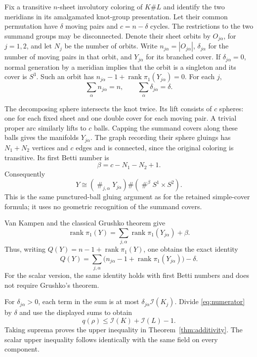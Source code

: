 \documentclass[11pt]{article}
\newcommand{\rank}{\operatorname{rank}}
\newcommand{\I}{\mathcal I}
\begin{document}
Fix a transitive $n$-sheet involutory coloring of $K\#L$ and identify
the two meridians in its amalgamated knot-group presentation.
Let their common permutation have $\delta$ moving pairs and
$c=n-\delta$ cycles. The restrictions to the two summand groups may
be disconnected. Denote their sheet orbits by $O_{j\alpha}$, for
$j=1,2$, and let $N_j$ be the number of orbits. Write
$n_{j\alpha}=|O_{j\alpha}|$, $\delta_{j\alpha}$ for the number of
moving pairs in that orbit, and $Y_{j\alpha}$ for its branched cover.
If $\delta_{j\alpha}=0$, normal generation by a meridian implies
that the orbit is a singleton and its cover is $S^3$. Such an orbit
has $n_{j\alpha}-1+\rank\pi_1(Y_{j\alpha})=0$.
For each $j$,
\[
        \sum_\alpha n_{j\alpha}=n,\qquad
        \sum_\alpha\delta_{j\alpha}=\delta.
\]

The decomposing sphere intersects the knot twice. Its lift consists
of $c$ spheres: one for each fixed sheet and one double cover for each
moving pair. A trivial proper arc similarly lifts to $c$ balls.
Capping the summand covers along these balls gives the manifolds
$Y_{j\alpha}$. The graph recording their sphere gluings has
$N_1+N_2$ vertices and $c$ edges and is connected, since the original
coloring is transitive. Its first Betti number is
\[
                         \beta=c-N_1-N_2+1.
\]
Consequently
\[
 Y\cong\left(\mathop{\#}_{j,\alpha}Y_{j\alpha}\right)
          \#\left(\mathop{\#}^{\beta}S^1\times S^2\right).
\]
This is the same punctured-ball gluing argument as for the retained
simple-cover formula; it uses no geometric recognition of the
summand covers.

Van Kampen and the classical Grushko theorem \cite[Theorem 1.B.5]{stallings}
give
\[
 \rank\pi_1(Y)=\sum_{j,\alpha}\rank\pi_1(Y_{j\alpha})+\beta.
\]
Thus, writing $Q(Y)=n-1+\rank\pi_1(Y)$, one obtains the exact identity
\begin{equation}\label{eq:numerator}
 Q(Y)=\sum_{j,\alpha}
  \bigl(n_{j\alpha}-1+\rank\pi_1(Y_{j\alpha})\bigr)-\delta.
\end{equation}
For the scalar version, the same identity holds with first Betti
numbers and does not require Grushko's theorem.

For $\delta_{j\alpha}>0$, each term in the sum is at most
$\delta_{j\alpha}\I(K_j)$. Divide \eqref{eq:numerator} by $\delta$
and use the displayed sums to obtain
\[
                         q(\rho)\le\I(K)+\I(L)-1.
\]
Taking suprema proves the upper inequality in Theorem~\ref{thm:additivity}.
The scalar upper inequality follows identically with the same field
on every component.
\end{document}
